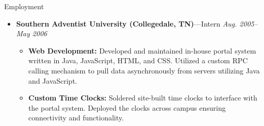 \documentclass[11pt,oneside]{article}
\newenvironment{ressection}[1]{
	\vspace{4pt}
	{\fontfamily{phv}\selectfont\Large#1}
	\begin{itemize}
	\vspace{3pt}
}{
	\end{itemize}
}
\newcommand{\ressubitem}[1]{
	\vspace{-1pt}
	\item \begin{flushleft} #1 \end{flushleft}
}
\newcommand{\resbigitem}[3]{
	\vspace{-5pt}
	\item
	{\textbf{#1}---#2 \hfill \textit{#3}}
}
\newenvironment{restitledposition}[3]{
	\resbigitem{#1}{#2}{#3}
	\vspace{-2pt}
	\begin{itemize}
}{
	\end{itemize}
}
\begin{document}
\begin{ressection}{Employment}
	\begin{restitledposition}{Southern Adventist University (Collegedale, TN)}{Intern}{Aug. 2005--May 2006}

	\ressubitem{\textbf{Web Development:} Developed and maintained
	in-house portal system written in Java, JavaScript, HTML, and CSS.
	Utilized a custom RPC calling mechanism	to pull data asynchronously
	from servers utilizing Java and JavaScript.}

	\ressubitem{\textbf{Custom Time Clocks:} Soldered site-built time clocks to
	interface with the portal system.  Deployed the clocks across campus ensuring
	connectivity and functionality.}

	\end{restitledposition}



\end{ressection}
\end{document}
